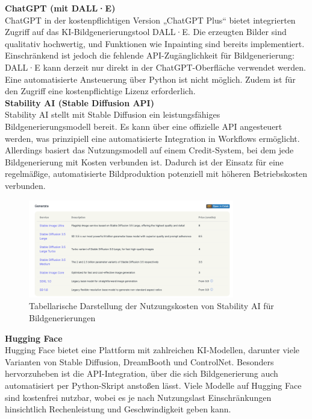 \documentclass[a4paper,12pt]{article}
\begin{document}
\textbf{ChatGPT (mit DALL·E)} \\
ChatGPT in der kostenpflichtigen Version „ChatGPT Plus“ bietet integrierten Zugriff auf das KI-Bildgenerierungstool DALL·E. Die erzeugten Bilder sind qualitativ hochwertig, und Funktionen wie Inpainting sind bereits implementiert.
Einschränkend ist jedoch die fehlende API-Zugänglichkeit für Bildgenerierung: DALL·E kann derzeit nur direkt in der ChatGPT-Oberfläche verwendet werden. Eine automatisierte Ansteuerung über Python ist nicht möglich. Zudem ist für den Zugriff eine kostenpflichtige Lizenz erforderlich.
\\

\textbf{Stability AI (Stable Diffusion API)} \\
Stability AI stellt mit Stable Diffusion ein leistungsfähiges Bildgenerierungsmodell bereit. Es kann über eine offizielle API angesteuert werden, was prinzipiell eine automatisierte Integration in Workflows ermöglicht.
Allerdings basiert das Nutzungsmodell auf einem Credit-System, bei dem jede Bildgenerierung mit Kosten verbunden ist. Dadurch ist der Einsatz für eine regelmäßige, automatisierte Bildproduktion potenziell mit höheren Betriebskosten verbunden.

\begin{figure}[h]
    \centering
    \includegraphics[width=0.8\textwidth]{images/StabilityAI.png}
    \caption{Tabellarische Darstellung der Nutzungskosten von Stability AI für Bildgenerierungen}
    \label{fig:stabilityai}
\end{figure}


\textbf{Hugging Face} \\
Hugging Face bietet eine Plattform mit zahlreichen KI-Modellen, darunter viele Varianten von Stable Diffusion, DreamBooth und ControlNet. Besonders hervorzuheben ist die API-Integration, über die sich Bildgenerierung auch automatisiert per Python-Skript anstoßen lässt.
Viele Modelle auf Hugging Face sind kostenfrei nutzbar, wobei es je nach Nutzungslast Einschränkungen hinsichtlich Rechenleistung und Geschwindigkeit geben kann.
\\
\end{document}
